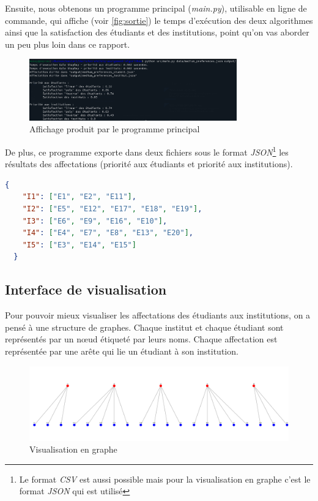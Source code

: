 \documentclass[12pt,titlepage]{article}
\begin{document}
Ensuite, nous obtenons un programme principal (\textit{main.py}), utilisable en ligne de commande, qui affiche (voir \autoref{fig:sortie}) le temps d'exécution des deux algorithmes ainsi que la satisfaction des étudiants et des institutions, point qu'on vas aborder un peu plus loin dans ce rapport.

\begin{figure}[!h]
\centering
\includegraphics[width = 0.8\textwidth]{img/sortie_programme.png}
\caption{Affichage produit par le programme principal}
\label{fig:sortie}
\end{figure}

De plus, ce programme exporte dans deux fichiers sous le format \textit{JSON}\footnote{Le format \textit{CSV} est aussi possible mais pour la visualisation en graphe c'est le format \textit{JSON} qui est utilisé} les résultats des affectations (priorité aux étudiants et priorité aux institutions).

\begin{lstlisting}[language=json, caption="Fichier des affectations\, priorité au étudiants"]
  {
    "I1": ["E1", "E2", "E11"],
    "I2": ["E5", "E12", "E17", "E18", "E19"],
    "I3": ["E6", "E9", "E16", "E10"],
    "I4": ["E4", "E7", "E8", "E13", "E20"],
    "I5": ["E3", "E14", "E15"]
  }
\end{lstlisting}

\subsection{Interface de visualisation}

Pour pouvoir mieux visualiser les affectations des étudiants aux institutions, on a pensé à une structure de graphes. Chaque institut et chaque étudiant sont représentés par un nœud étiqueté par leurs noms. Chaque affectation est représentée par une arête qui lie un étudiant à son institution.

\begin{figure}[!h]
\centering
\includegraphics[width = 1.0\textwidth]{img/Screen_graph_dash.png}
\caption{Visualisation en graphe}
\end{figure}
\end{document}
